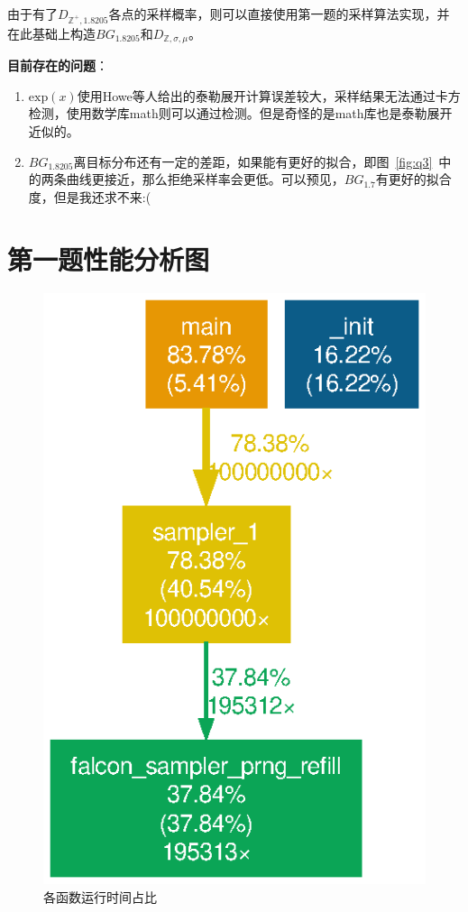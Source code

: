 \documentclass{article}
\begin{document}
    由于有了$D_{\mathbb{Z}^+, 1.8205}$各点的采样概率，则可以直接使用第一题的采样算法实现，并在此基础上构造$BG_{1.8205}$和$D_{\mathbb{Z}, \sigma, \mu}$。

    \textbf{目前存在的问题}：
    \begin{enumerate}
        \item $\mathrm{exp}(x)$使用Howe等人\cite{q3}给出的泰勒展开计算误差较大，采样结果无法通过卡方检测，使用数学库math则可以通过检测。但是奇怪的是math库也是泰勒展开近似的。
        \item $BG_{1.8205}$离目标分布还有一定的差距，如果能有更好的拟合，即图~\ref{fig:q3}~中的两条曲线更接近，那么拒绝采样率会更低。可以预见，$BG_{1.7}$有更好的拟合度，但是我还求不来:(
    \end{enumerate}
    
    \appendix
    \newpage
    \section{第一题性能分析图}
    \begin{figure}[htb]
        \centering
        \includegraphics[width=.6\textwidth]{../gprof_figs/sampler_1.eps}
        \caption{各函数运行时间占比}
    \end{figure}

    
\end{document}
